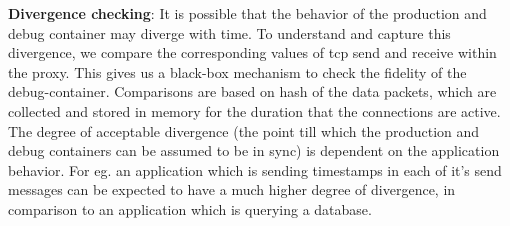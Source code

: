 

\textbf{Divergence checking}: 
It is possible that the behavior of the production and debug container may diverge with time.
To understand and capture this divergence, we compare the corresponding values of tcp send and receive within the proxy.
This gives us a black-box mechanism to check the fidelity of the debug-container.
Comparisons are based on hash of the data packets, which are collected and stored in memory for the duration that the connections are active.
The degree of acceptable divergence (the point till which the production and debug containers can be assumed to be in sync) is dependent on the application behavior. 
For eg. an application which is sending timestamps in each of it's send messages can be expected to have a much higher degree of divergence, in comparison to an application which is querying a database.

